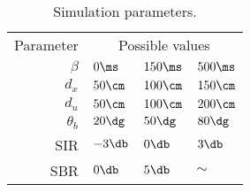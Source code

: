 \begin{table}[!ht]
	\centering
	\renewcommand{\arraystretch}{1.4}
	\begin{tabular}{r l l l}
		Parameter & \multicolumn{3}{c}{Possible values} \\
		\hhline{====}
		$\beta$ & $0\ms$ & $150\ms$ & $500\ms$ \\
		$d_{x}$ & $50\cm$ & $100\cm$ & $150\cm$ \\
		$d_{u}$ & $50\cm$ & $100\cm$ & $200\cm$ \\
		$\theta_b$ & $20\dg$ & $50\dg$ & $80\dg$ \\
		SIR & $-3\db$ & $0\db $& $3\db$ \\
		SBR & $0\db$ & $5\db$ & $\sim$
	\end{tabular}
	\caption{Simulation parameters.}
	\label{tab:sec3:simulation_parameters}
\end{table}